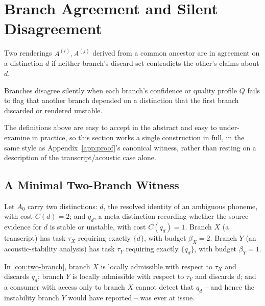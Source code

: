 \section{Branch Agreement and Silent Disagreement}

\begin{definition}
\label{def:branch-agreement}
Two renderings $A^{(i)}, A^{(j)}$ derived from a common ancestor are in
agreement on a distinction $d$ if neither branch's discard set
contradicts the other's claims about $d$.
\end{definition}

\begin{definition}
\label{def:silent-disagreement}
Branches disagree silently when each branch's confidence or quality
profile $Q$ fails to flag that another branch depended on a distinction
that the first branch discarded or rendered unstable.
\end{definition}

The definitions above are easy to accept in the abstract and easy to
under-examine in practice, so this section works a single construction
in full, in the same style as Appendix~\ref{app:proof}'s canonical
witness, rather than resting on a description of the transcript/acoustic
case alone.

\subsection{A Minimal Two-Branch Witness}

\begin{construction}
\label{con:two-branch}
Let $A_0$ carry two distinctions: $d$, the resolved identity of an
ambiguous phoneme, with cost $C(d) = 2$; and $q_d$, a meta-distinction
recording whether the source evidence for $d$ is stable or unstable, with
cost $C(q_d) = 1$. Branch $X$ (a transcript) has task $\tau_X$ requiring
exactly $\{d\}$, with budget $\beta_X = 2$. Branch $Y$ (an
acoustic-stability analysis) has task $\tau_Y$ requiring exactly
$\{q_d\}$, with budget $\beta_Y = 1$.
\end{construction}

\begin{proposition}
\label{prop:witness-silent-disagreement}
In \cref{con:two-branch}, branch $X$ is locally admissible with respect
to $\tau_X$ and discards $q_d$; branch $Y$ is locally admissible with
respect to $\tau_Y$ and discards $d$; and a consumer with access only to
branch $X$ cannot detect that $q_d$ -- and hence the instability branch
$Y$ would have reported -- was ever at issue.
\end{proposition}

